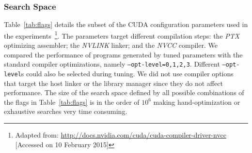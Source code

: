 \subsubsection{Search Space}

Table~\ref{tab:flags} details the subset of the CUDA configuration parameters
used in the experiments~\footnote{Adapted from:
\url{http://docs.nvidia.com/cuda/cuda-compiler-driver-nvcc} [Accessed on 10
February 2015]}.  The parameters target different compilation steps: the
\emph{PTX} optimizing assembler; the \emph{NVLINK} linker; and the \emph{NVCC}
compiler.  We compared the performance of programs generated by tuned
parameters with the standard compiler optimizations, namely
\texttt{--opt-level=0,1,2,3}.  Different \texttt{--opt-level}s could also be
selected during tuning.  We did not use compiler options that target the host
linker or the library manager since they do not affect performance.  The size
of the search space defined by all possible combinations of the flags in
Table~\ref{tab:flags} is in the order of $10^{6}$ making hand-optimization or
exhaustive searches very time consuming.

